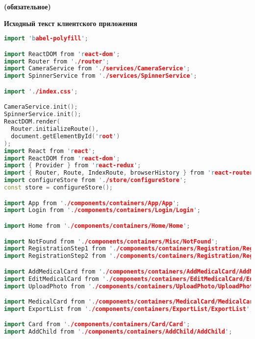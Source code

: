 \begin{center}
\vspace{-1em}
\textbf{ (обязательное)}

\textbf{Исходный текст клиентского приложения}
\end{center}


\begin{lstlisting}[language=C++, style=cplusplusstyle]
import 'babel-polyfill';

import ReactDOM from 'react-dom';
import Router from './router';
import CameraService from './services/CameraService';
import SpinnerService from './services/SpinnerService';

import './index.css';

CameraService.init();
SpinnerService.init();
ReactDOM.render(
  Router.initializeRoute(),
  document.getElementById('root')
);
import React from 'react';
import ReactDOM from 'react-dom';
import { Provider } from 'react-redux';
import { Router, Route, IndexRoute, browserHistory } from 'react-router';
import configureStore from './store/configureStore';
const store = configureStore();

import App from './components/containers/App/App';
import Login from './components/containers/Login/Login';

import Home from './components/containers/Home/Home';

import NotFound from './components/containers/Misc/NotFound';
import RegistrationStep1 from './components/containers/Registration/RegistrationStep1';
import RegistrationStep2 from './components/containers/Registration/RegistrationStep2';

import AddMedicalCard from './components/containers/AddMedicalCard/AddMedicalCard';
import EditMedicalCard from './components/containers/EditMedicalCard/EditMedicalCard';
import UploadPhoto from './components/containers/UploadPhoto/UploadPhoto';

import MedicalCard from './components/containers/MedicalCard/MedicalCard';
import ExportList from './components/containers/ExportList/ExportList';

import Card from './components/containers/Card/Card';
import AddChild from './components/containers/AddChild/AddChild';


\end{lstlisting}

